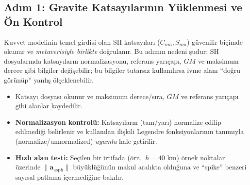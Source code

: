 \subsection{Adım 1: Gravite Katsayılarının Yüklenmesi ve Ön Kontrol}
Kuvvet modelinin temel girdisi olan SH katsayıları ($C_{nm},S_{nm}$) güvenilir biçimde okunur ve \emph{metaverisiyle birlikte}
doğrulanır. Bu adımın nedeni şudur: SH dosyalarında katsayıların normalizasyonu, referans yarıçapı, $GM$ ve maksimum derece
gibi bilgiler değişebilir; bu bilgiler tutarsız kullanılırsa ivme alanı ``doğru görünüp'' yanlış ölçeklenebilir.

\begin{itemize}
    \item Katsayı dosyası okunur ve maksimum derece/sıra, $GM$ ve referans yarıçapı gibi alanlar kaydedilir.
    \item \textbf{Normalizasyon kontrolü:} Katsayıların (tam/yarı) normalize edilip edilmediği belirlenir ve kullanılan
    ilişkili Legendre fonksiyonlarının tanımıyla (normalize/unnormalized) \emph{uyumlu} hale getirilir.
    \item \textbf{Hızlı alan testi:} Seçilen bir irtifada (örn.\ $h=40$ km) örnek noktalar üzerinde
    $\|\mathbf a_{\text{asph}}\|$ büyüklüğünün makul aralıkta olduğuna ve ``spike'' benzeri sayısal patlama içermediğine bakılır.
\end{itemize}

